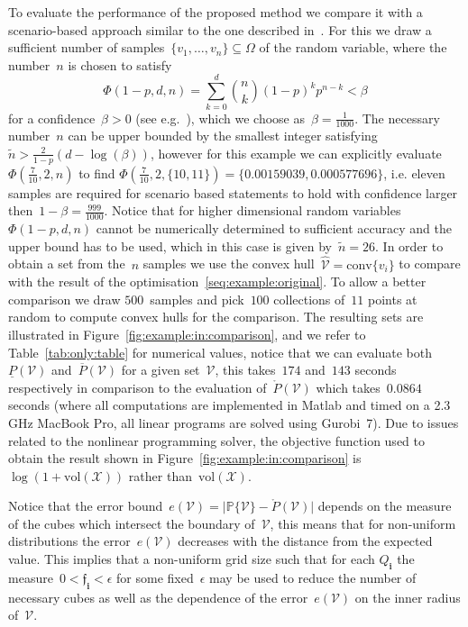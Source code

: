 \documentclass[letterpaper, 10pt, conference]{ieeeconf} %
\providecommand{\conv}{\text{conv}}
\providecommand{\bfa}[1]{\mathbf{#1}}
\begin{document}
%
To evaluate the performance of the proposed method we compare it with a scenario-based approach similar to the one described in~\cite{Margellos:2014}.
%
For this we draw a sufficient number of samples~$\{v_1,\dots,v_n\}\subseteq\Omega$ of the random variable, where the number~$n$ is chosen to satisfy
\[
\Phi(1-p,d,n) = \sum_{k=0}^{d}\binom{n}{k}(1-p)^kp^{n-k}<\beta
\]
for a confidence~$\beta>0$ (see e.g.~\cite{Calafiore:2010}), which we choose as~$\beta=\frac{1}{1000}$.
%
The necessary number~$n$ can be upper bounded by the smallest integer satisfying~$\tilde n>\frac{2}{1-p}(d-\log(\beta))$, however for this example we can explicitly evaluate~$\Phi(\frac{7}{10},2,n)$ to find $\Phi(\frac{7}{10},2,\{10,11\}) = \{0.00159039,0.000577696\}$, i.e. eleven samples are required for scenario based statements to hold with confidence larger then~$1-\beta=\frac{999}{1000}$.
%
Notice that for higher dimensional random variables~$\Phi(1-p,d,n)$ cannot be numerically determined to sufficient accuracy and the upper bound has to be used, which in this case is given by~$\tilde n=26$.
%
In order to obtain a set from the~$n$ samples we use the convex hull~$\hat{\mathcal V}=\conv\{v_i\}$ to compare with the result of the optimisation~\eqref{seq:example:original}.
%
To allow a better comparison we draw $500$~samples and pick~$100$ collections of~$11$ points at random to compute convex hulls for the comparison.
%
The resulting sets are illustrated in Figure~\ref{fig:example:in:comparison}, and we refer to Table~\ref{tab:only:table} for numerical values, notice that we can evaluate both~$\underline{P}(\mathcal V)$ and~$\overline{P}(\mathcal V)$ for a given set~$\mathcal V$, this takes~$174$ and~$143$ seconds respectively in comparison to the evaluation of~$\mathring{P}(\mathcal V)$ which takes~$0.0864$ seconds (where all computations are implemented in Matlab and timed on a 2.3 GHz MacBook Pro, all linear programs are solved using Gurobi~7).
%
Due to issues related to the nonlinear programming solver, the objective function used to obtain the result shown in Figure~\ref{fig:example:in:comparison} is~$\log(1+\text{vol}(\mathcal X))$ rather than~$\text{vol}(\mathcal X)$.
%


%
Notice that the error bound~$e(\mathcal V) = \lvert\mathbb P\{\mathcal V\}-\mathring{P}(\mathcal V)\rvert$ depends on the measure of the cubes which intersect the boundary of~$\mathcal V$, this means that for non-uniform distributions the error~$e(\mathcal V)$ decreases with the distance from the expected value.
%
This implies that a non-uniform grid size such that for each $Q_\bfa{i}$ the measure~$0<\mathfrak{f}_\bfa{i}<\epsilon$ for some fixed~$\epsilon$ may be used to reduce the number of necessary cubes as well as the dependence of the error~$e(\mathcal V)$ on the inner radius of~$\mathcal V$.
\end{document}
